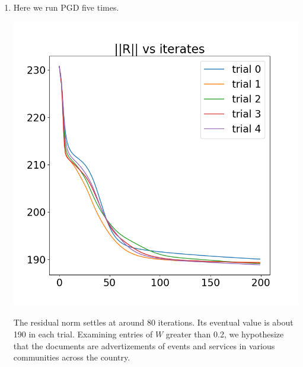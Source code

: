 \documentclass{article}
\begin{document}
\begin{enumerate}
\begin{enumerate}
		\item Here we run PGD five times.
		\begin{center}
			\includegraphics[scale=.3]{hw6 pgd}
		\end{center}
		The residual norm settles at around 80 iterations. Its eventual value is about 190 in each trial. Examining entries of $W$ greater than 0.2, we hypothesize that the documents are advertizements of events and services in various communities across the country.
		
		
		

\end{enumerate}
\end{enumerate}
\end{document}
